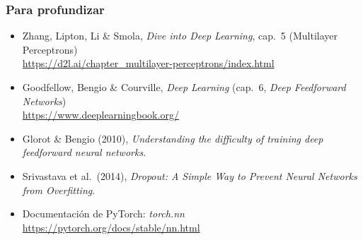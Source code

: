 \documentclass[aspectratio=169, 10pt]{beamer}
\begin{document}
\begin{frame}
\frametitle{Para profundizar}
\begin{itemize}
	\item Zhang, Lipton, Li \& Smola, \emph{Dive into Deep Learning}, cap.~5 (Multilayer Perceptrons)\\ \url{https://d2l.ai/chapter_multilayer-perceptrons/index.html}
	\item Goodfellow, Bengio \& Courville, \emph{Deep Learning} (cap.~6, \emph{Deep Feedforward Networks})\\ \url{https://www.deeplearningbook.org/}
	\item Glorot \& Bengio (2010), \emph{Understanding the difficulty of training deep feedforward neural networks}.
	\item Srivastava et al.\ (2014), \emph{Dropout: A Simple Way to Prevent Neural Networks from Overfitting}.
	\item Documentaci\'on de PyTorch: \emph{torch.nn}\\ \url{https://pytorch.org/docs/stable/nn.html}
\end{itemize}
\end{frame}
\end{document}
